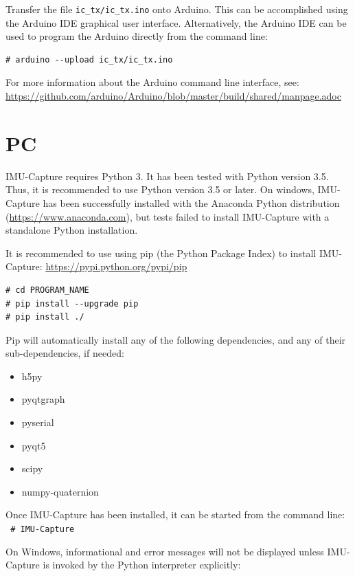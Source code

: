 \documentclass[11pt,letterpaper,article,oneside]{memoir}
\newcommand{\name}{IMU-Capture}
\begin{document}
Transfer the file \verb|ic_tx/ic_tx.ino| onto Arduino.  This can be accomplished
using the Arduino IDE graphical user interface.  Alternatively, the Arduino IDE
can be used to program the Arduino directly from the command line:

\begin{verbatim}
# arduino --upload ic_tx/ic_tx.ino
\end{verbatim}

For more information about the Arduino command line interface, see:
\url{https://github.com/arduino/Arduino/blob/master/build/shared/manpage.adoc}


\section{PC}
\label{sec:installPc}

\name{} requires Python 3. It has been tested with Python version 3.5. Thus, it
is recommended to use Python version 3.5 or later. On windows, \name{} has been
successfully installed with the Anaconda Python distribution
(\url{https://www.anaconda.com}), but tests failed to install \name{} with a
standalone Python installation.

It is recommended to use using pip (the Python Package Index) to install
\name{}: \url{https://pypi.python.org/pypi/pip}

\begin{verbatim}
# cd PROGRAM_NAME
# pip install --upgrade pip
# pip install ./
\end{verbatim}

Pip will automatically install any of the following dependencies, and any of their sub-dependencies, if needed:
\begin{itemize}
\item h5py
\item pyqtgraph
\item pyserial
\item pyqt5
\item scipy
\item numpy-quaternion
\end{itemize}

Once \name{} has been installed, it can be started from the command line:\\

\texttt{
\# \name{}
}

On Windows, informational and error messages will not be displayed unless
\name{} is invoked by the Python interpreter explicitly:
\end{document}
